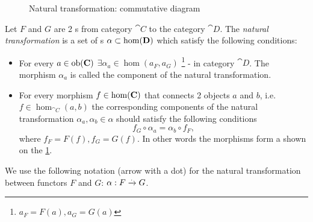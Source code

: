 \begin{definition}
\label{def:nt}

\begin{figure}
  \centering
  \caption{Natural transformation: commutative diagram}
  \label{fig:nt_def}
\end{figure}

Let $F$ and $G$ are 2 s from category $\cat{C}$
to the category $\cat{D}$. The \textit{natural transformation} is a
set of s $\alpha \subset \mathrm{hom}(\mathbf{D})$ which
satisfy the following conditions:
\begin{itemize}
\item For every  $a \in \mathrm{ob}(\mathbf{C})$ $\exists
\alpha_a \in \hom\left(a_F, a_G\right)$
\footnote{
$a_F = F(a), a_G = G(a)$
}
- 
in category $\cat{D}$. The morphism $\alpha_a$ is called the component of
the natural transformation.
\item For every morphism $f \in \mathrm{hom}(\mathbf{C})$ that connects 2 objects
  $a$ and $b$, i.e. $f \in \hom_{\cat{C}}(a,b)$ the corresponding components of
  the natural transformation $\alpha_a, \alpha_b \in \alpha$ should
  satisfy the following conditions
  \begin{equation}
    f_G \circ \alpha_a = \alpha_b \circ f_F,
    \label{eq:nt_definition}
  \end{equation}
  where $f_F = F(f), f_G = G(f)$.
  In other words the morphisms form a
   shown on the \cref{fig:nt_def}. 
\end{itemize}

We use the following notation (arrow with a dot) for the natural transformation between
functors $F$ and $G$: $\alpha: F \xrightarrow{.} G$. 
\end{definition}


